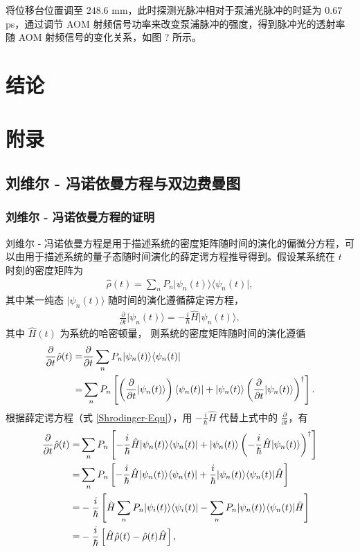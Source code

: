 \documentclass{thesis}
\begin{document}
将位移台位置调至 $248.6$ mm，此时探测光脉冲相对于泵浦光脉冲的时延为 $0.67$ ps，通过调节 AOM 射频信号功率来改变泵浦脉冲的强度，得到脉冲光的透射率随 AOM 射频信号的变化关系，如图 ? 所示。

\chapter{结论}

\chapter{附录}
\section{刘维尔 - 冯诺依曼方程与双边费曼图}
\subsection{刘维尔 - 冯诺依曼方程的证明}
刘维尔 - 冯诺依曼方程是用于描述系统的密度矩阵随时间的演化的偏微分方程，可以由用于描述系统的量子态随时间演化的薛定谔方程推导得到。假设某系统在 $t$ 时刻的密度矩阵为
\begin{align}
    \hat{\rho}(t)=\sum_nP_n\lvert\psi_n(t)\rangle\langle\psi_n(t)\rvert,
\end{align}
其中某一纯态 $\lvert\psi_n(t)\rangle$ 随时间的演化遵循薛定谔方程，
\begin{align}
    \label{Shrodinger-Equ}
    \frac{\partial}{\partial t}\lvert\psi_n(t)\rangle=-\frac{i}{\hbar}\hat{H}\lvert\psi_n(t)\rangle,
\end{align}
其中 $\hat{H}(t)$ 为系统的哈密顿量，
则系统的密度矩阵随时间的演化遵循
\begin{align}
    \notag\frac{\partial}{\partial t}\hat{\rho}(t)=&\frac{\partial}{\partial t}\sum_nP_n\lvert\psi_n(t)\rangle\langle\psi_n(t)\rvert\\
    =&\sum_nP_n\left[\left(\frac{\partial}{\partial t}\lvert\psi_n(t)\rangle\right)\langle\psi_n(t)\rvert+\lvert\psi_n(t)\rangle\left(\frac{\partial}{\partial t}\lvert\psi_n(t)\rangle\right)^{\dagger}\right].
\end{align}
根据薛定谔方程（式 \eqref{Shrodinger-Equ}），用 $-\frac{i}{\hbar}\hat{H}$ 代替上式中的 $\frac{\partial}{\partial t}$，有
\begin{align}
    \notag\frac{\partial}{\partial t}\hat{\rho}(t)=&\sum_nP_n\left[-\frac{i}{\hbar}\hat{H}\lvert\psi_n(t)\rangle\langle\psi_n(t)\rvert+\lvert\psi_n(t)\rangle\left(-\frac{i}{\hbar}\hat{H}\lvert\psi_n(t)\rangle\right)^{\dagger}\right]\\
    \notag=&\sum_nP_n\left[-\frac{i}{\hbar}\hat{H}\lvert\psi_n(t)\rangle\langle\psi_n(t)\rvert+\frac{i}{\hbar}\lvert\psi_n(t)\rangle\langle\psi_n(t)\rvert\hat{H}\right]\\
    \notag=&-\frac{i}{\hbar}\left[\hat{H}\sum_nP_n\lvert\psi_i(t)\rangle\langle\psi_i(t)\rvert-\sum_nP_n\lvert\psi_n(t)\rangle\langle\psi_n(t)\rvert\hat{H}\right]\\
    =&-\frac{i}{\hbar}\left[\hat{H}\hat{\rho}(t)-\hat{\rho}(t)\hat{H}\right],
\end{align}
\end{document}
